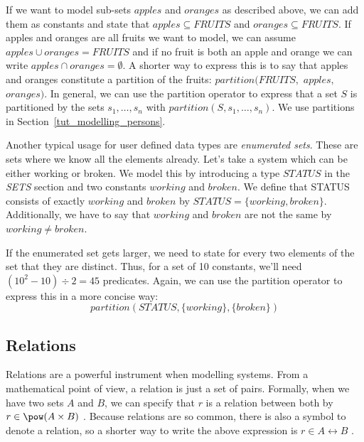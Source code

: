 
If we want to model sub-sets $apples$ and $oranges$ as described above, we can add them as
constants and state that $apples \subseteq FRUITS$ and $oranges \subseteq FRUITS$.
If apples and oranges are all fruits we want to model, we can assume $apples \cup oranges = FRUITS$
and if no fruit is both an apple and orange we can write $apples \cap oranges = \emptyset$.
A shorter way to express this is to say that apples and oranges constitute a
partition of the fruits: $partition(FRUITS,$ $apples,$ $oranges)$. %
In general, we can use the partition operator to express that a set $S$ is partitioned by the
sets $s_1,\ldots,s_n$ with $partition(S,s_1,\ldots,s_n)$.  We use partitions in Section~\ref{tut_modelling_persons}.

Another typical usage for user defined data types are \emph{enumerated sets}.
These are sets where we know all the elements already. Let's take a system which can be either working or broken.
We model this by introducing a type $STATUS$ in the \textsl{SETS} section and two constants
$working$ and $broken$.
We define that STATUS consists of exactly $working$ and $broken$ by $STATUS = \{working,broken\}$.
Additionally, we have to say that $working$ and $broken$ are not the same by $working \neq broken$.

If the enumerated set gets larger, we need to state for every two elements of the set that they are
distinct. Thus, for a set of 10 constants, we'll need $(10^2-10)\div 2 = 45$ predicates.
Again, we can use the partition operator to express this in a more concise way: 
\[partition(STATUS,\{working\},\{broken\})\]

\subsection{Relations}
\label{tut_relations}
Relations are a powerful instrument when modelling systems. From a mathematical point of view, a
relation is just a set of pairs. Formally, when we have two sets $A$ and $B$, we can specify that
$r$ is a relation between both by $r \in \pow(A\cprod B)$ .
Because relations are so common, there is also a symbol to denote a relation, so a shorter way to write the above expression is $r \in A\rel B$ .

